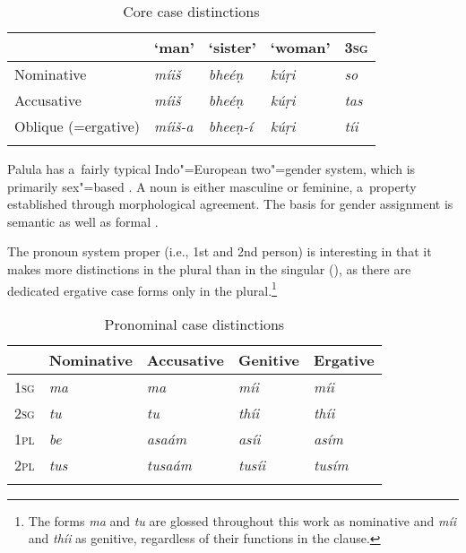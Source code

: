 \begin{table}[ht]
\caption{Core case distinctions}
\begin{tabularx}{\textwidth}{ l@{\hspace{25pt}} Q Q Q Q }
\lsptoprule
&
`man' &
`sister' &
`woman' &
\textsc{3sg}
\\\hline
Nominative &
\textit{míiš} &
\textit{bheéṇ} &
\textit{kúṛi} &
\textit{so} \\
Accusative &
\textit{míiš} &
\textit{bheéṇ} &
\textit{kúṛi} &
\textit{tas} \\
Oblique (=ergative) &
\textit{míiš-a} &
\textit{bheeṇ-í} &
\textit{kúṛi} &
\textit{tíi}
\\\lspbottomrule
\end{tabularx}
\label{tab:2-case}
\end{table}


Palula has a~fairly typical Indo"=European two"=gender system, which is primarily sex"=based \citep{corbett_sex-based_2013}. A noun is either masculine or feminine, a~property established through morphological agreement. The basis for gender assignment is semantic as well as formal \citep{corbett_systems_2013}.


The pronoun system proper (i.e., 1st and 2nd person) is interesting in that it makes more distinctions in the plural than in the singular (), as there are dedicated ergative case forms only in the plural.\footnote{The forms \textit{ma} and \textit{tu} are glossed throughout this work as nominative and \textit{míi} and \textit{thíi} as genitive, regardless of their functions in the clause.}

\begin{table}[ht]
\caption{Pronominal case distinctions}
\begin{tabularx}{\textwidth}{ l Q Q Q Q }
\lsptoprule
&
Nominative &
Accusative &
Genitive &
Ergative
\\\hline
\textsc{1sg} &
\textit{ma} &
\textit{ma} &
\textit{míi} &
\textit{míi} \\
\textsc{2sg} &
\textit{tu} &
\textit{tu} &
\textit{thíi} &
\textit{thíi} \\
\textsc{1pl} &
\textit{be} &
\textit{asaám} &
\textit{asíi} &
\textit{asím} \\
\textsc{2pl} &
\textit{tus} &
\textit{tusaám} &
\textit{tusíi} &
\textit{tusím} 
\\\lspbottomrule
\end{tabularx}
\label{tab:2-pron}
\end{table}


